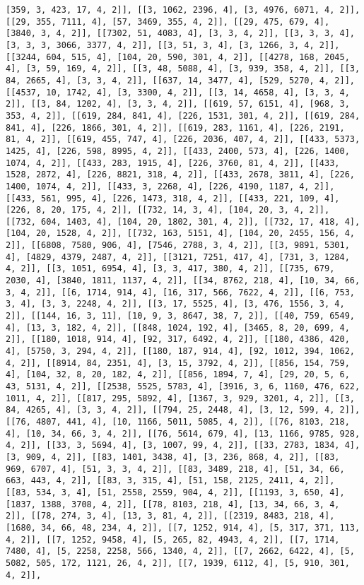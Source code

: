 \documentclass[12pt,fleqn]{article}\usepackage{../../common}
\begin{document}
\begin{verbatim}
[359, 3, 423, 17, 4, 2]], [[3, 1062, 2396, 4], [3, 4976, 6071, 4, 2]], [[29, 355, 7111, 4], [57, 3469, 355, 4, 2]], [[29, 475, 679, 4], [3840, 3, 4, 2]], [[7302, 51, 4083, 4], [3, 3, 4, 2]], [[3, 3, 3, 4], [3, 3, 3, 3066, 3377, 4, 2]], [[3, 51, 3, 4], [3, 1266, 3, 4, 2]], [[3244, 604, 515, 4], [104, 20, 590, 301, 4, 2]], [[4278, 168, 2045, 4], [3, 59, 169, 4, 2]], [[3, 48, 5088, 4], [3, 939, 358, 4, 2]], [[3, 84, 2665, 4], [3, 3, 4, 2]], [[637, 14, 3477, 4], [529, 5270, 4, 2]], [[4537, 10, 1742, 4], [3, 3300, 4, 2]], [[3, 14, 4658, 4], [3, 3, 4, 2]], [[3, 84, 1202, 4], [3, 3, 4, 2]], [[619, 57, 6151, 4], [968, 3, 353, 4, 2]], [[619, 284, 841, 4], [226, 1531, 301, 4, 2]], [[619, 284, 841, 4], [226, 1866, 301, 4, 2]], [[619, 283, 1161, 4], [226, 2191, 81, 4, 2]], [[619, 455, 747, 4], [226, 2036, 407, 4, 2]], [[433, 5373, 1425, 4], [226, 598, 8995, 4, 2]], [[433, 2400, 573, 4], [226, 1400, 1074, 4, 2]], [[433, 283, 1915, 4], [226, 3760, 81, 4, 2]], [[433, 1528, 2872, 4], [226, 8821, 318, 4, 2]], [[433, 2678, 3811, 4], [226, 1400, 1074, 4, 2]], [[433, 3, 2268, 4], [226, 4190, 1187, 4, 2]], [[433, 561, 995, 4], [226, 1473, 318, 4, 2]], [[433, 221, 109, 4], [226, 8, 20, 175, 4, 2]], [[732, 14, 3, 4], [104, 20, 3, 4, 2]], [[732, 604, 1403, 4], [104, 20, 1802, 301, 4, 2]], [[732, 17, 418, 4], [104, 20, 1528, 4, 2]], [[732, 163, 5151, 4], [104, 20, 2455, 156, 4, 2]], [[6808, 7580, 906, 4], [7546, 2788, 3, 4, 2]], [[3, 9891, 5301, 4], [4829, 4379, 2487, 4, 2]], [[3121, 7251, 417, 4], [731, 3, 1284, 4, 2]], [[3, 1051, 6954, 4], [3, 3, 417, 380, 4, 2]], [[735, 679, 2030, 4], [3840, 1811, 1137, 4, 2]], [[34, 8762, 218, 4], [10, 34, 66, 3, 4, 2]], [[6, 1714, 914, 4], [16, 317, 566, 7622, 4, 2]], [[6, 753, 3, 4], [3, 3, 2248, 4, 2]], [[3, 17, 5525, 4], [3, 476, 1556, 3, 4, 2]], [[144, 16, 3, 11], [10, 9, 3, 8647, 38, 7, 2]], [[40, 759, 6549, 4], [13, 3, 182, 4, 2]], [[848, 1024, 192, 4], [3465, 8, 20, 699, 4, 2]], [[180, 1018, 914, 4], [92, 317, 6492, 4, 2]], [[180, 4386, 420, 4], [5750, 3, 294, 4, 2]], [[180, 187, 914, 4], [92, 1012, 394, 1062, 4, 2]], [[8914, 84, 2351, 4], [3, 15, 3792, 4, 2]], [[856, 154, 759, 4], [104, 32, 8, 20, 182, 4, 2]], [[856, 1894, 7, 4], [29, 20, 5, 6, 43, 5131, 4, 2]], [[2538, 5525, 5783, 4], [3916, 3, 6, 1160, 476, 622, 1011, 4, 2]], [[817, 295, 5892, 4], [1367, 3, 929, 3201, 4, 2]], [[3, 84, 4265, 4], [3, 3, 4, 2]], [[794, 25, 2448, 4], [3, 12, 599, 4, 2]], [[76, 4807, 441, 4], [10, 1166, 5011, 5085, 4, 2]], [[76, 8103, 218, 4], [10, 34, 66, 3, 4, 2]], [[76, 5614, 679, 4], [13, 1166, 9785, 928, 4, 2]], [[33, 3, 5694, 4], [3, 1007, 99, 4, 2]], [[33, 2783, 1834, 4], [3, 909, 4, 2]], [[83, 1401, 3438, 4], [3, 236, 868, 4, 2]], [[83, 969, 6707, 4], [51, 3, 3, 4, 2]], [[83, 3489, 218, 4], [51, 34, 66, 663, 443, 4, 2]], [[83, 3, 315, 4], [51, 158, 2125, 2411, 4, 2]], [[83, 534, 3, 4], [51, 2558, 2559, 904, 4, 2]], [[1193, 3, 650, 4], [1837, 1388, 3708, 4, 2]], [[78, 8103, 218, 4], [13, 34, 66, 3, 4, 2]], [[78, 274, 3, 4], [13, 3, 81, 4, 2]], [[2319, 8483, 218, 4], [1680, 34, 66, 48, 234, 4, 2]], [[7, 1252, 914, 4], [5, 317, 371, 113, 4, 2]], [[7, 1252, 9458, 4], [5, 265, 82, 4943, 4, 2]], [[7, 1714, 7480, 4], [5, 2258, 2258, 566, 1340, 4, 2]], [[7, 2662, 6422, 4], [5, 5082, 505, 172, 1121, 26, 4, 2]], [[7, 1939, 6112, 4], [5, 910, 301, 4, 2]], 
\end{verbatim}
\end{document}
